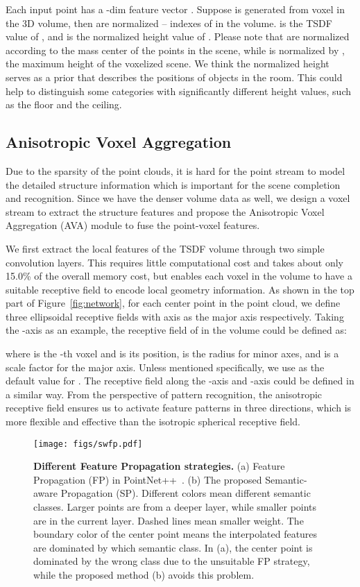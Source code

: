 Each input point  has a -dim feature vector . 
Suppose  is generated from voxel  in the  3D volume, then  are normalized -- indexes of  in the volume. 
 is the TSDF value of , and  is the normalized height value of . 
Please note that  are normalized according to the mass center of the points in the scene, while  is normalized by , the maximum height of the voxelized scene. 
We think the normalized height serves as a prior that describes the positions of objects in the room. 
This could help to distinguish some categories with significantly different height values, such as the floor and the ceiling.

\subsection{Anisotropic Voxel Aggregation}
Due to the sparsity of the point clouds, it is hard for the point stream to model the detailed structure information which is important for the scene completion and recognition. 
Since we have the denser volume data as well, we design a voxel stream to extract the structure features and propose the Anisotropic Voxel Aggregation (AVA) module to fuse the point-voxel features.

We first extract the local features of the TSDF volume through two simple convolution layers. 
This requires little computational cost and takes about only 15.0\% of the overall memory cost, but enables each voxel in the volume to have a suitable receptive field to encode local geometry information. 
As shown in the top part of Figure~\ref{fig:network}, for each center point  in the point cloud, we define three ellipsoidal receptive fields with  axis as the major axis respectively. 
Taking the -axis as an example, the receptive field  of  in the volume could be defined as:

where  is the -th voxel and  is its position,  is the radius for minor axes, and  is a scale factor for the major axis. 
Unless mentioned specifically, we use  as the default value for . 
The receptive field along the -axis and -axis could be defined in a similar way. 
From the perspective of pattern recognition, the anisotropic receptive field ensures us to activate feature patterns in three directions, which is more flexible and effective than the isotropic spherical receptive field.

\begin{figure}[htbp]
  \centering
  \texttt{[image: figs/swfp.pdf]}
  \caption{ \textbf{Different Feature Propagation strategies.} (a)  Feature Propagation (FP) in PointNet++~\protect\cite{qi2017pointnet++}. (b) The proposed Semantic-aware Propagation (SP). Different colors mean different semantic classes. Larger points are from a deeper layer, while smaller points are in the current layer. Dashed lines mean smaller weight. The boundary color of the center point means the interpolated features are dominated by which semantic class. In (a), the center point is dominated by the wrong class due to the unsuitable FP strategy, while the proposed method (b) avoids this problem.}
  \label{fig:SP}
\end{figure}

